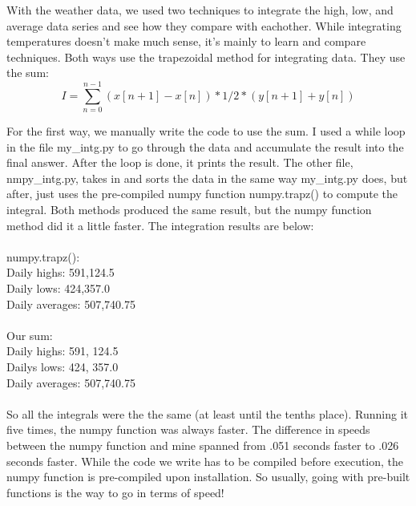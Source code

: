 With the weather data, we used two techniques to integrate the high, low, and average data series and see how they compare with eachother. While integrating temperatures doesn't make much sense, it's mainly to learn and compare techniques. Both ways use the trapezoidal method for integrating data. They use the sum:
\begin{equation}
  I = \sum_{n=0}^{n-1} (x[n+1] - x[n]) * 1/2 *(y[n+1] + y[n])
\end{equation}

For the first way, we manually write the code to use the sum. I used a while loop in the file my\_intg.py to go through the data and accumulate the result into the final answer. After the loop is done, it prints the result. The other file, nmpy\_intg.py, takes in and sorts the data in the same way my\_intg.py does, but after, just uses the pre-compiled numpy function numpy.trapz() to compute the integral. Both methods produced the same result, but the numpy function method did it a little faster. The integration results are below:
\\ 
\\numpy.trapz():
\\Daily highs: 591,124.5
\\Daily lows: 424,357.0
\\Daily averages: 507,740.75
\\
\\Our sum:
\\Daily highs: 591, 124.5
\\Dailys lows: 424, 357.0
\\Daily averages: 507,740.75
\\ 
\\So all the integrals were the the same (at least until the tenths place). Running it five times, the numpy function was always faster. The difference in speeds between the numpy function and mine spanned from .051 seconds faster to .026 seconds faster. While the code we write has to be compiled before execution, the numpy function is pre-compiled upon installation. So usually, going with pre-built functions is the way to go in terms of speed!
